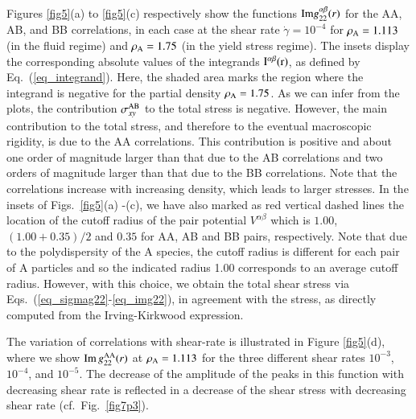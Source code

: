 Figures \ref{fig5}(a) to \ref{fig5}(c) respectively show the functions ${\rm Im} g_{22}^{\alpha\beta}(r)$ for the AA, AB, and BB correlations, in each case at the shear rate $\dot{\gamma} = 10^{-4}$ for $\rho_{\rm A}=1.113$ (in the fluid regime) and $\rho_{\rm A} = 1.75$ (in the yield stress regime). The insets display the corresponding absolute values of the integrands $\rm I^{\alpha\beta}(r)$, as defined by Eq.~(\ref{eq_integrand}). Here, the shaded area marks the region where the integrand is negative for the partial density $\rho_{\rm A} = 1.75$. As we can infer from the plots, the contribution $\sigma_{xy}^{\rm AB}$ to the total stress is negative. However, the main contribution to the total stress, and therefore to the eventual macroscopic rigidity, is due to the AA correlations. This contribution is positive and about one order of magnitude larger than that due to the AB correlations and two orders of magnitude larger than that due to the BB correlations. Note that the correlations increase with increasing density, which leads to larger stresses. In the insets of Figs.~\ref{fig5}(a) -(c), we have also marked as red vertical dashed lines the location of the cutoff radius of the pair potential $V^{\alpha\beta}$  which is $1.00$, $(1.00+0.35)/2$ and $0.35$ for AA, AB and BB pairs, respectively. Note that due to the polydispersity of the A species, the cutoff radius is different for each pair of A particles and so the indicated radius 1.00 corresponds to an average cutoff radius. However, with this choice, we obtain the total shear stress via Eqs.~(\ref{eq_sigmag22}-\ref{eq_img22}), in agreement with the stress, as directly computed from the Irving-Kirkwood expression.

The variation of correlations with shear-rate is illustrated in Figure \ref{fig5}(d), where we show ${\rm Im} \, g_{22}^{\rm AA}(r)$ at $\rho_{\rm A} = 1.113$ for the three different shear rates $10^{-3}$, $10^{-4}$, and $10^{-5}$. The decrease of the amplitude of the peaks in this function with decreasing shear rate is reflected in a decrease of the shear stress with decreasing shear rate (cf.~Fig.~\ref{fig7p3}).

